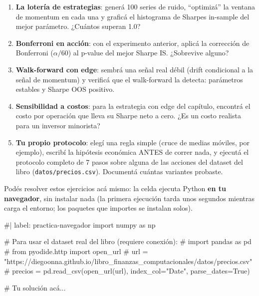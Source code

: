 \documentclass[
  spanish,
  letterpaper,
  DIV=11,
  numbers=noendperiod]{scrreprt}
\newenvironment{Shaded}{\begin{snugshade}}{\end{snugshade}}
\newcommand{\NormalTok}[1]{\textcolor[rgb]{0.00,0.23,0.31}{#1}}
\providecommand{\tightlist}{%
  \setlength{\itemsep}{0pt}\setlength{\parskip}{0pt}}
\begin{document}
\begin{tcolorbox}[enhanced jigsaw, bottomrule=.15mm, colback=white, opacitybacktitle=0.6, arc=.35mm, toprule=.15mm, opacityback=0, breakable, titlerule=0mm, left=2mm, coltitle=black, colbacktitle=quarto-callout-important-color!10!white, colframe=quarto-callout-important-color-frame, leftrule=.75mm, toptitle=1mm, bottomtitle=1mm, title=\textcolor{quarto-callout-important-color}{\faExclamation}\hspace{0.5em}{Ejercicios}, rightrule=.15mm]

\begin{enumerate}
\def\labelenumi{\arabic{enumi}.}
\tightlist
\item
  \textbf{La lotería de estrategias}: generá 100 series de ruido,
  ``optimizá'' la ventana de momentum en cada una y graficá el
  histograma de Sharpes in-sample del mejor parámetro. ¿Cuántos superan
  1.0?
\item
  \textbf{Bonferroni en acción}: con el experimento anterior, aplicá la
  corrección de Bonferroni (\(\alpha/60\)) al p-value del mejor Sharpe
  IS. ¿Sobrevive alguno?
\item
  \textbf{Walk-forward con edge}: sembrá una señal real débil (drift
  condicional a la señal de momentum) y verificá que el walk-forward la
  detecta: parámetros estables y Sharpe OOS positivo.
\item
  \textbf{Sensibilidad a costos}: para la estrategia con edge del
  capítulo, encontrá el costo por operación que lleva su Sharpe neto a
  cero. ¿Es un costo realista para un inversor minorista?
\item
  \textbf{Tu propio protocolo}: elegí una regla simple (cruce de medias
  móviles, por ejemplo), escribí la hipótesis económica ANTES de correr
  nada, y ejecutá el protocolo completo de 7 pasos sobre alguna de las
  acciones del dataset del libro (\texttt{datos/precios.csv}). Documentá
  cuántas variantes probaste.
\end{enumerate}

\end{tcolorbox}

Podés resolver estos ejercicios acá mismo: la celda ejecuta Python
\textbf{en tu navegador}, sin instalar nada (la primera ejecución tarda
unos segundos mientras carga el entorno; los paquetes que importes se
instalan solos).

\begin{Shaded}
\begin{Highlighting}[]
\NormalTok{\#| label: practica{-}navegador}
\NormalTok{import numpy as np}

\NormalTok{\# Para usar el dataset real del libro (requiere conexión):}
\NormalTok{\# import pandas as pd}
\NormalTok{\# from pyodide.http import open\_url}
\NormalTok{\# url = "https://diegoonna.github.io/libro\_finanzas\_computacionales/datos/precios.csv"}
\NormalTok{\# precios = pd.read\_csv(open\_url(url), index\_col="Date", parse\_dates=True)}

\NormalTok{\# Tu solución acá...}
\end{Highlighting}
\end{Shaded}
\end{document}
